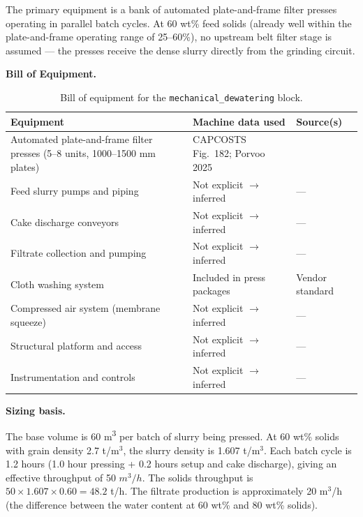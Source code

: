 The primary equipment is a bank of automated plate-and-frame filter presses operating in parallel batch cycles. At 60 wt\% feed solids (already well within the plate-and-frame operating range of 25--60\%), no upstream belt filter stage is assumed --- the presses receive the dense slurry directly from the grinding circuit.

\medskip
\noindent\textbf{Bill of Equipment.}\quad

\begin{table}[h!]
\caption{Bill of equipment for the \texttt{mechanical\_dewatering} block.}
\centering
\begin{tabular}{>{\raggedright\arraybackslash}p{5.2cm}
				>{\raggedright\arraybackslash}p{4cm}
				>{\raggedright\arraybackslash}p{4.5cm}}
\toprule
\textbf{Equipment} & \textbf{Machine data used} & \textbf{Source(s)} \\
\midrule
Automated plate-and-frame filter presses (5--8 units, 1000--1500 mm plates) & CAPCOSTS Fig.~182; Porvoo 2025 & \citet{mularCAPCOSTS1998, porvooFilterPressCost2025} \\
Feed slurry pumps and piping & Not explicit $\rightarrow$ inferred & --- \\
Cake discharge conveyors & Not explicit $\rightarrow$ inferred & --- \\
Filtrate collection and pumping & Not explicit $\rightarrow$ inferred & --- \\
Cloth washing system & Included in press packages & Vendor standard \\
Compressed air system (membrane squeeze) & Not explicit $\rightarrow$ inferred & --- \\
Structural platform and access & Not explicit $\rightarrow$ inferred & --- \\
Instrumentation and controls & Not explicit $\rightarrow$ inferred & --- \\
\bottomrule
\end{tabular}
\end{table}

\medskip
\noindent\textbf{Sizing basis.}\quad

The base volume is 60 \si{m^3} per batch of slurry being pressed. At 60 wt\% solids with grain density 2.7 t/m$^3$, the slurry density is 1.607 t/m$^3$. Each batch cycle is 1.2 hours (1.0 hour pressing + 0.2 hours setup and cake discharge), giving an effective throughput of 50 $\si{m^3/h}$. The solids throughput is $50 \times 1.607 \times 0.60 = 48.2$ t/h. The filtrate production is approximately 20 m$^3$/h (the difference between the water content at 60 wt\% and 80 wt\% solids).

